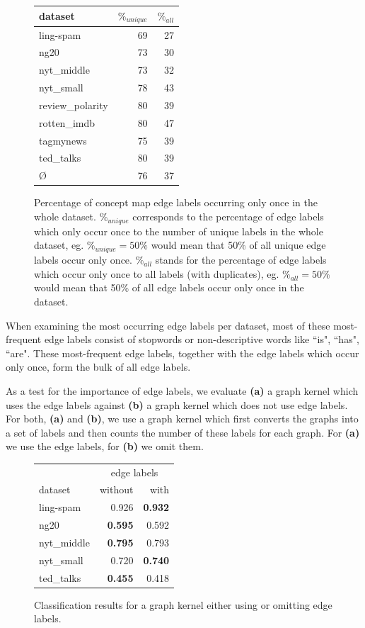 \begin{figure}[ht]
	\centering
	\begin{tabular}{lrr}
		dataset &  $ \%_{unique} $ & $ \%_{all}$  \\
		\midrule
		ling-spam       & 69 & 27 \\
		ng20            & 73 & 30 \\
		nyt\_middle      & 73 & 32 \\
		nyt\_small       & 78 & 43 \\
		review\_polarity & 80 & 39 \\
		rotten\_imdb     & 80 & 47 \\
		tagmynews       & 75 & 39 \\
		ted\_talks       & 80 & 39 \\
		\midrule
		\O           & 76 & 37 \\
		\bottomrule
	\end{tabular}
	\caption{Percentage of concept map edge labels occurring only once in the whole dataset.
		$ \%_{unique} $ corresponds to the percentage of edge labels which only occur once to the number of unique labels in the whole dataset, eg. $ \%_{unique} = 50\% $ would mean that 50\% of all unique edge labels occur only once.
		$ \%_{all}$ stands for the percentage of edge labels which occur only once to all labels (with duplicates), eg. $ \%_{all} = 50\%$ would mean that 50\% of all edge labels occur only once in the dataset.}\label{fig:edge_label_occurrences}
\end{figure}

When examining the most occurring edge labels per dataset, most of these most-frequent edge labels consist of stopwords or non-descriptive words like ``is", ``has", ``are".
These most-frequent edge labels, together with the edge labels which occur only once, form the bulk of all edge labels.

As a test for the importance of edge labels, we evaluate \textbf{(a)} a graph kernel which uses the edge labels against \textbf{(b)} a graph kernel which does not use edge labels.
For both, \textbf{(a)} and \textbf{(b)}, we use a graph kernel which first converts the graphs into a set of labels and then counts the number of these labels for each graph.
For \textbf{(a)} we use the edge labels, for \textbf{(b)} we omit them.

\begin{figure}[ht]
	\centering
\begin{tabular}{lrr}
	{} & \multicolumn{2}{c}{edge labels} \\
	dataset & without & with \\
	\midrule
	ling-spam  & 0.926 & \textbf{0.932} \\
	ng20       & \textbf{0.595} & 0.592 \\
	nyt\_middle & \textbf{0.795} & 0.793 \\
	nyt\_small  & 0.720 &\textbf{ 0.740} \\
	ted\_talks  & \textbf{0.455} & 0.418 \\
	\bottomrule
\end{tabular}
\caption{Classification results for a graph kernel either using or omitting edge labels.}\label{fig:edge_label_classification}
\end{figure}

